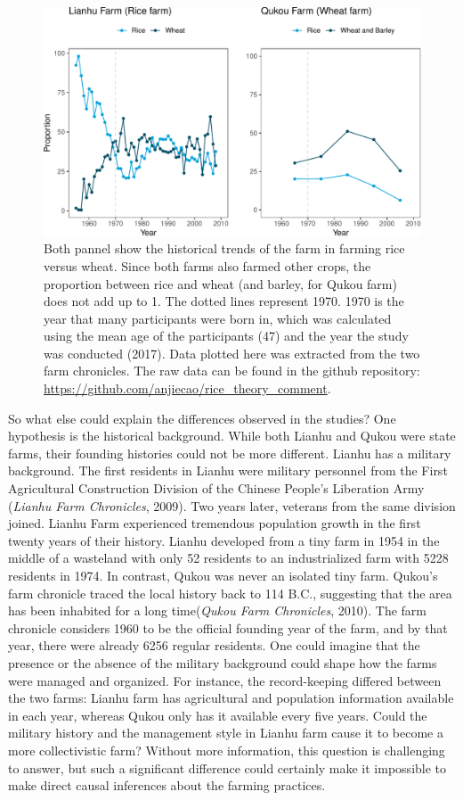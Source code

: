 \documentclass[
  man]{apa6}
\begin{document}
\begin{figure}
\centering
\includegraphics{comment_files/figure-latex/unnamed-chunk-2-1.pdf}
\caption{\label{fig:unnamed-chunk-2}Both pannel show the historical trends of the farm in farming rice versus wheat. Since both farms also farmed other crops, the proportion between rice and wheat (and barley, for Qukou farm) does not add up to 1. The dotted lines represent 1970. 1970 is the year that many participants were born in, which was calculated using the mean age of the participants (47) and the year the study was conducted (2017). Data plotted here was extracted from the two farm chronicles. The raw data can be found in the github repository: \url{https://github.com/anjiecao/rice_theory_comment}.}
\end{figure}

So what else could explain the differences observed in the studies? One hypothesis is the historical background. While both Lianhu and Qukou were state farms, their founding histories could not be more different. Lianhu has a military background. The first residents in Lianhu were military personnel from the First Agricultural Construction Division of the Chinese People's Liberation Army (\emph{Lianhu Farm Chronicles}, 2009). Two years later, veterans from the same division joined. Lianhu Farm experienced tremendous population growth in the first twenty years of their history. Lianhu developed from a tiny farm in 1954 in the middle of a wasteland with only 52 residents to an industrialized farm with 5228 residents in 1974. In contrast, Qukou was never an isolated tiny farm. Qukou's farm chronicle traced the local history back to 114 B.C., suggesting that the area has been inhabited for a long time(\emph{Qukou Farm Chronicles}, 2010). The farm chronicle considers 1960 to be the official founding year of the farm, and by that year, there were already 6256 regular residents. One could imagine that the presence or the absence of the military background could shape how the farms were managed and organized. For instance, the record-keeping differed between the two farms: Lianhu farm has agricultural and population information available in each year, whereas Qukou only has it available every five years. Could the military history and the management style in Lianhu farm cause it to become a more collectivistic farm? Without more information, this question is challenging to answer, but such a significant difference could certainly make it impossible to make direct causal inferences about the farming practices.
\end{document}
